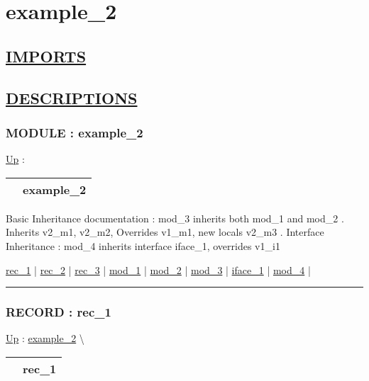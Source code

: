 \chapter*{example\_2}
\hypertarget{ecldoc:toc:example_2}{}

\section*{\underline{IMPORTS}}

\section*{\underline{DESCRIPTIONS}}
\subsection*{MODULE : example\_2}
\hypertarget{ecldoc:example_2}{}
\hyperlink{ecldoc:toc:root}{Up} :

{\renewcommand{\arraystretch}{1.5}
\begin{tabularx}{\textwidth}{|>{\raggedright\arraybackslash}l|X|}
\hline
\hspace{0pt} & example\_2 \\
\hline
\end{tabularx}
}

\par
Basic Inheritance documentation : mod\_3 inherits both mod\_1 and mod\_2 . Inherits v2\_m1, v2\_m2, Overrides v1\_m1, new locals v2\_m3 . Interface Inheritance : mod\_4 inherits interface iface\_1, overrides v1\_i1


\hyperlink{ecldoc:example_2.rec_1}{rec\_1}  |
\hyperlink{ecldoc:example_2.rec_2}{rec\_2}  |
\hyperlink{ecldoc:example_2.rec_3}{rec\_3}  |
\hyperlink{ecldoc:example_2.mod_1}{mod\_1}  |
\hyperlink{ecldoc:example_2.mod_2}{mod\_2}  |
\hyperlink{ecldoc:example_2.mod_3}{mod\_3}  |
\hyperlink{ecldoc:example_2.iface_1}{iface\_1}  |
\hyperlink{ecldoc:example_2.mod_4}{mod\_4}  |

\rule{\linewidth}{0.5pt}

\subsection*{RECORD : rec\_1}
\hypertarget{ecldoc:example_2.rec_1}{}
\hyperlink{ecldoc:example_2}{Up} :
\hspace{0pt} \hyperlink{ecldoc:example_2}{example_2} \textbackslash 

{\renewcommand{\arraystretch}{1.5}
\begin{tabularx}{\textwidth}{|>{\raggedright\arraybackslash}l|X|}
\hline
\hspace{0pt} & rec\_1 \\
\hline
\end{tabularx}
}

